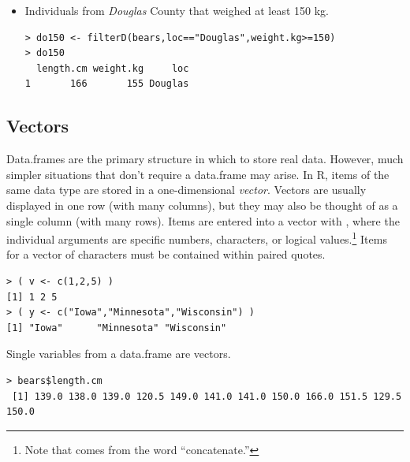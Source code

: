 \documentclass[10pt,openany]{book}\usepackage[]{graphicx}\usepackage[]{color}
\makeatletter
\newenvironment{kframe}{%
 \def\at@end@of@kframe{}%
 \ifinner\ifhmode%
  \def\at@end@of@kframe{\end{minipage}}%
  \begin{minipage}{\columnwidth}%
 \fi\fi%
 \def\FrameCommand##1{\hskip\@totalleftmargin \hskip-\fboxsep
 \colorbox{shadecolor}{##1}\hskip-\fboxsep
     \hskip-\linewidth \hskip-\@totalleftmargin \hskip\columnwidth}%
 \MakeFramed {\advance\hsize-\width
   \@totalleftmargin\z@ \linewidth\hsize
   \@setminipage}}%
 {\par\unskip\endMakeFramed%
 \at@end@of@kframe}
\newenvironment{knitrout}{}{} %
\makeatother
\begin{document}
\begin{itemize}
  \item Individuals from \emph{Douglas} County that weighed at least 150 kg.
\vspace{-4pt}
\begin{knitrout}
\color{fgcolor}\begin{kframe}
\begin{verbatim}
> do150 <- filterD(bears,loc=="Douglas",weight.kg>=150)
> do150
  length.cm weight.kg     loc
1       166       155 Douglas
\end{verbatim}
\end{kframe}
\end{knitrout}
\end{itemize}


\subsection{Vectors}  \label{sect:RVectors}
\vspace{-4pt}
Data.frames are the primary structure in which to store real data. However, much simpler situations that don't require a data.frame may arise. In R, items of the same data type  are stored in a one-dimensional \emph{vector}. Vectors are usually displayed in one row (with many columns), but they may also be thought of as a single column (with many rows). Items are entered into a vector with , where the individual arguments are specific numbers, characters, or logical values.\footnote{Note that  comes from the word ``concatenate.''}  Items for a vector of characters must be contained within paired quotes.
\vspace{-4pt}
\begin{knitrout}
\color{fgcolor}\begin{kframe}
\begin{verbatim}
> ( v <- c(1,2,5) )
[1] 1 2 5
> ( y <- c("Iowa","Minnesota","Wisconsin") )
[1] "Iowa"      "Minnesota" "Wisconsin"
\end{verbatim}
\end{kframe}
\end{knitrout}

Single variables from a data.frame are vectors.
\vspace{-4pt}
\begin{knitrout}
\color{fgcolor}\begin{kframe}
\begin{verbatim}
> bears$length.cm
 [1] 139.0 138.0 139.0 120.5 149.0 141.0 141.0 150.0 166.0 151.5 129.5 150.0
\end{verbatim}
\end{kframe}
\end{knitrout}
\end{document}

